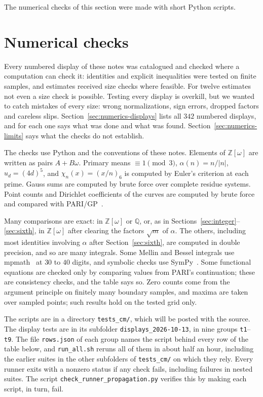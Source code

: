 \documentclass[11pt]{article}
\numberwithin{equation}{section}
\newcommand{\OO}{\mathbb Z[\omega]}
\begin{document}
The numerical checks of this section were made with short Python scripts.

\section{Numerical checks}\label{sec:numerics}

Every numbered display of these notes was catalogued and checked where a computation can check it: identities
and explicit inequalities were tested on finite samples, and estimates received size checks where feasible.
For twelve estimates not even a size check is possible. Testing every display is overkill, but we wanted to catch mistakes of every size: wrong normalizations,
sign errors, dropped factors and careless slips. Section~\ref{sec:numerics-displays} lists all $342$ numbered displays, and for each one says what was
done and what was found. Section~\ref{sec:numerics-limits} says what the checks do not establish.

The checks use Python and the conventions of these notes. Elements of $\OO$ are written as pairs $A+B\omega$.
Primary means $\equiv1\pmod3$, $\alpha(n)=n/|n|$, $u_d=(4d)^5$, and $\chi_n(x)=(x/n)_6$ is computed by Euler's
criterion at each prime. Gauss sums are computed by brute force over complete residue systems. Point counts and
Dirichlet coefficients of the curves are computed by brute force and compared with PARI/GP~\cite{PARI}.

Many comparisons are exact: in $\OO$ or $\mathbb Q$, or, as in
Sections~\ref{sec:integer}--\ref{sec:sixth}, in $\OO$ after clearing the factors $\sqrt m$ of $\alpha$. The
others, including most identities involving $\alpha$ after Section~\ref{sec:sixth}, are computed in double
precision, and so are many integrals. Some Mellin and Bessel integrals use mpmath~\cite{mpmath} at $30$ to $40$ digits, and
symbolic checks use SymPy~\cite{SymPy}. Some functional equations are checked only by comparing values from PARI's
continuation; these are consistency checks, and the table says so. Zero counts come from the argument principle on
finitely many boundary samples, and maxima are taken over sampled points; such results hold on the tested grid
only.

The scripts are in a directory \texttt{tests\_cm/}, which will be posted with the source. The display tests are in its subfolder
\texttt{displays\_2026-10-13}, in nine groups \texttt{t1}--\texttt{t9}. The file \texttt{rows.json} of each group
names the script behind every row of the table below, and \texttt{run\_all.sh} reruns all of them in about half an
hour, including the earlier suites in the other subfolders of \texttt{tests\_cm/} on which they rely. Every runner
exits with a nonzero status if any check fails, including failures in nested suites. The script
\texttt{check\_runner\_propagation.py} verifies this by making each script, in turn, fail.
\end{document}
